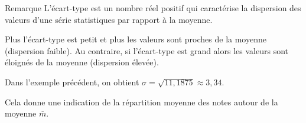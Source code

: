 \documentclass[xcolor={dvipsnames,svgnames,table}]{beamer}
\begin{document}
\begin{frame}{Remarque}
    L'écart-type est un nombre réel positif qui caractérise la dispersion des valeurs d'une série statistiques par rapport à la moyenne.\par
    Plus l'écart-type est petit et plus les valeurs sont proches de la moyenne (dispersion faible). Au contraire, si l'écart-type est grand alors les valeurs sont éloignés de la moyenne (dispersion élevée).
\pause

\begin{Example}
    Dans l'exemple précédent, on obtient $\sigma = \sqrt{11,1875} \approx 3,34$.\par
    Cela donne une indication de la répartition moyenne des notes autour de la moyenne $\overline m$.
\end{Example}
\end{frame}
\end{document}
